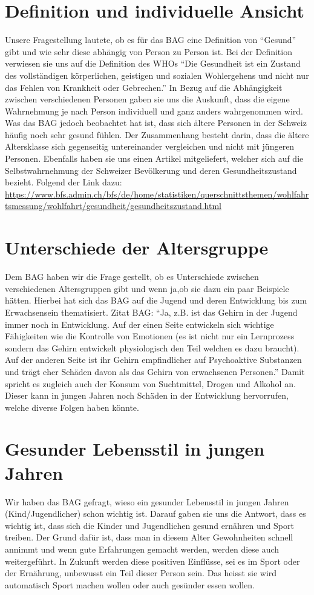 \section{Definition und individuelle Ansicht}
Unsere Fragestellung lautete, ob es für das BAG eine Definition von “Gesund” gibt und wie sehr diese abhängig von Person zu Person ist. Bei der Definition verwiesen sie uns auf die Definition des WHOs “Die Gesundheit ist ein Zustand des vollständigen körperlichen, geistigen und sozialen Wohlergehens und nicht nur das Fehlen von Krankheit oder Gebrechen.” \cite{gesundheit_definition}
In Bezug auf die Abhängigkeit zwischen verschiedenen Personen gaben sie uns die Auskunft, dass die eigene Wahrnehmung je nach Person individuell und ganz anders wahrgenommen wird. Was das BAG jedoch beobachtet hat ist, dass sich ältere Personen in der Schweiz häufig noch sehr gesund fühlen. Der Zusammenhang besteht darin, dass die ältere Altersklasse sich gegenseitig untereinander vergleichen und nicht mit jüngeren Personen. Ebenfalls haben sie uns  einen Artikel mitgeliefert, welcher sich auf die Selbstwahrnehmung der Schweizer Bevölkerung und deren Gesundheitszustand bezieht. Folgend der Link dazu:
\newline
\url{https://www.bfs.admin.ch/bfs/de/home/statistiken/querschnittsthemen/wohlfahrtsmessung/wohlfahrt/gesundheit/gesundheitszustand.html}
\section{Unterschiede der Altersgruppe}
Dem BAG haben wir die Frage gestellt, ob es Unterschiede zwischen verschiedenen Altersgruppen gibt und wenn ja,ob sie dazu ein paar Beispiele hätten. Hierbei hat sich das BAG auf die Jugend und deren Entwicklung bis zum Erwachsensein thematisiert. Zitat BAG: “Ja, z.B. ist das Gehirn in der Jugend immer noch in Entwicklung. Auf der einen Seite entwickeln sich wichtige Fähigkeiten wie die Kontrolle von Emotionen (es ist nicht nur ein Lernprozess sondern das Gehirn entwickelt physiologisch den Teil welchen es dazu braucht). Auf der anderen Seite ist ihr Gehirn empfindlicher auf Psychoaktive Substanzen und trägt eher Schäden davon als das Gehirn von erwachsenen Personen.” Damit spricht es zugleich auch der Konsum von Suchtmittel, Drogen und Alkohol an. Dieser kann in jungen Jahren noch Schäden in der Entwicklung hervorrufen, welche diverse Folgen haben könnte.
\section{Gesunder Lebensstil in jungen Jahren}
Wir haben das BAG gefragt, wieso ein gesunder Lebensstil in jungen Jahren (Kind/Jugendlicher) schon wichtig ist. Darauf gaben sie uns die Antwort, dass es  wichtig ist, dass sich die Kinder und Jugendlichen gesund ernähren und Sport treiben. Der Grund dafür ist, dass man in diesem Alter Gewohnheiten schnell annimmt und wenn gute Erfahrungen gemacht werden, werden diese auch weitergeführt. In Zukunft werden diese positiven Einflüsse, sei es im Sport oder der Ernährung, unbewusst ein Teil dieser Person sein. Das heisst sie wird automatisch Sport machen wollen oder auch gesünder essen wollen.
